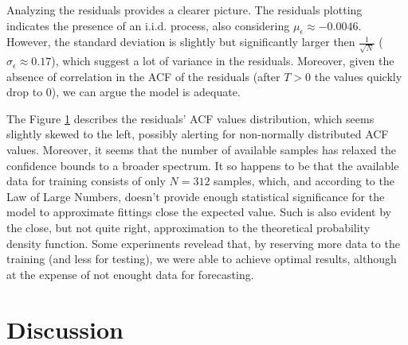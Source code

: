 \documentclass[conference]{IEEEtran}
\begin{document}

Analyzing the residuals provides a clearer picture. The residuals plotting indicates the presence of an i.i.d. process, also considering $\mu_\epsilon\approx -0.0046$. However, the standard deviation is slightly but significantly larger then $\frac{1}{\sqrt{N}}$ ($\sigma_\epsilon\approx 0.17$), which suggest a lot of variance in the residuals. Moreover, given the absence of correlation in the ACF of the residuals (after $T>0$ the values quickly drop to $0$), we can argue the model is adequate.



The Figure \ref{} describes the residuals' ACF values distribution, which seems slightly skewed to the left, possibly alerting for non-normally distributed ACF values. Moreover, it seems that the number of available samples has relaxed the confidence bounds to a broader spectrum. It so happens to be that the available data for training consists of only $N=312$ samples, which, and according to the Law of Large Numbers, doesn't provide enough statistical significance for the model to approximate fittings close the expected value. Such is also evident by the close, but not quite right, approximation to the theoretical probability density function. Some experiments revelead that, by reserving more data to the training (and less for testing), we were able to achieve optimal results, although at the expense of not enought data for forecasting.

\section{Discussion}

%
%
\end{document}
